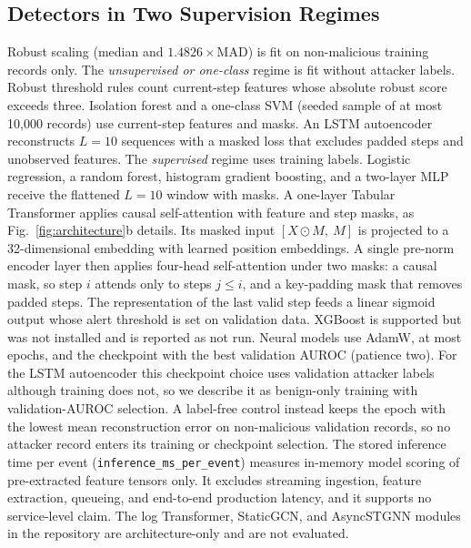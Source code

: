 \documentclass[preprint,12pt,numafflabel]{elsarticle}
\begin{document}
\subsection{Detectors in Two Supervision Regimes}
Robust scaling (median and $1.4826\times$MAD) is fit on non-malicious training records only. The \emph{unsupervised or one-class} regime is fit without attacker labels. Robust threshold rules count current-step features whose absolute robust score exceeds three. Isolation forest and a one-class SVM (seeded sample of at most 10,000 records) use current-step features and masks. An LSTM autoencoder reconstructs $L=10$ sequences with a masked loss that excludes padded steps and unobserved features. The \emph{supervised} regime uses training labels. Logistic regression, a random forest, histogram gradient boosting, and a two-layer MLP receive the flattened $L=10$ window with masks. A one-layer Tabular Transformer applies causal self-attention with feature and step masks, as Fig.~\ref{fig:architecture}b details. Its masked input $[X \odot M,\ M]$ is projected to a 32-dimensional embedding with learned position embeddings. A single pre-norm encoder layer then applies four-head self-attention under two masks: a causal mask, so step $i$ attends only to steps $j \le i$, and a key-padding mask that removes padded steps. The representation of the last valid step feeds a linear sigmoid output whose alert threshold is set on validation data. XGBoost is supported but was not installed and is reported as not run. Neural models use AdamW, at most \ResEpochs{} epochs, and the checkpoint with the best validation AUROC (patience two). For the LSTM autoencoder this checkpoint choice uses validation attacker labels although training does not, so we describe it as benign-only training with validation-AUROC selection. A label-free control instead keeps the epoch with the lowest mean reconstruction error on non-malicious validation records, so no attacker record enters its training or checkpoint selection. The stored inference time per event (\texttt{inference\_ms\_per\_event}) measures in-memory model scoring of pre-extracted feature tensors only. It excludes streaming ingestion, feature extraction, queueing, and end-to-end production latency, and it supports no service-level claim. The log Transformer, StaticGCN, and AsyncSTGNN modules in the repository are architecture-only and are not evaluated.
\end{document}
